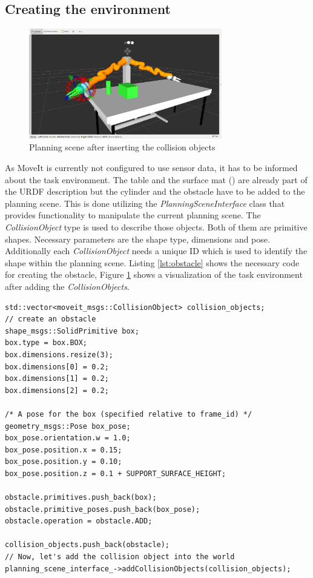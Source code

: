 \subsection{Creating the environment}
\begin{figure}[h]
	\centering
  	\includegraphics[width=0.75\textwidth]{images/task_env.png}
	\caption{Planning scene after inserting the collision objects}
	\label{fig:task_env}
\end{figure}
As MoveIt is currently not configured to use sensor data, it has to be informed about the task environment. The table and the surface mat () are already part of the URDF description but the cylinder and the obstacle have to be added to the planning scene. This is done utilizing the \emph{PlanningSceneInterface} class that provides functionality to manipulate the current planning scene. The \emph{CollisionObject} type is used to describe those objects. Both of them are primitive shapes. Necessary parameters are the shape type, dimensions and pose. Additionally each \emph{CollisionObject} needs a unique ID which is used to identify the shape within the planning scene. Listing \ref{lst:obstacle} shows the necessary code for creating the obstacle, Figure \ref{fig:task_env} shows a visualization of the task environment after adding the \emph{CollisionObjects}.

\lstset{style=customc}
\begin{minipage}{\linewidth}
\begin{lstlisting}[caption={Creating the obstacle}, label=lst:obstacle]
std::vector<moveit_msgs::CollisionObject> collision_objects;
// create an obstacle
shape_msgs::SolidPrimitive box;
box.type = box.BOX;
box.dimensions.resize(3);
box.dimensions[0] = 0.2;
box.dimensions[1] = 0.2;
box.dimensions[2] = 0.2;

/* A pose for the box (specified relative to frame_id) */
geometry_msgs::Pose box_pose;
box_pose.orientation.w = 1.0;
box_pose.position.x = 0.15;
box_pose.position.y = 0.10;
box_pose.position.z = 0.1 + SUPPORT_SURFACE_HEIGHT;

obstacle.primitives.push_back(box);
obstacle.primitive_poses.push_back(box_pose);
obstacle.operation = obstacle.ADD;

collision_objects.push_back(obstacle);
// Now, let's add the collision object into the world
planning_scene_interface_->addCollisionObjects(collision_objects);
\end{lstlisting}
\end{minipage}

